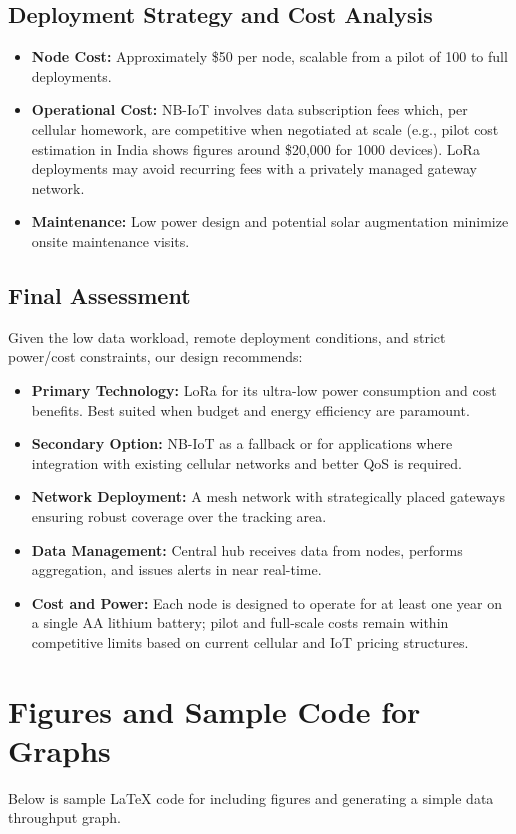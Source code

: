 \subsection{Deployment Strategy and Cost Analysis}
\begin{itemize}
    \item \textbf{Node Cost:} Approximately \$50 per node, scalable from a pilot of 100 to full deployments.
    \item \textbf{Operational Cost:} NB-IoT involves data subscription fees which, per cellular homework, are competitive when negotiated at scale (e.g., pilot cost estimation in India shows figures around \$20,000 for 1000 devices). LoRa deployments may avoid recurring fees with a privately managed gateway network.
    \item \textbf{Maintenance:} Low power design and potential solar augmentation minimize onsite maintenance visits.
\end{itemize}

\subsection{Final Assessment}
Given the low data workload, remote deployment conditions, and strict power/cost constraints, our design recommends:
\begin{itemize}
    \item \textbf{Primary Technology:} LoRa for its ultra-low power consumption and cost benefits. Best suited when budget and energy efficiency are paramount.
    \item \textbf{Secondary Option:} NB-IoT as a fallback or for applications where integration with existing cellular networks and better QoS is required.
    \item \textbf{Network Deployment:} A mesh network with strategically placed gateways ensuring robust coverage over the tracking area.
    \item \textbf{Data Management:} Central hub receives data from nodes, performs aggregation, and issues alerts in near real-time.
    \item \textbf{Cost and Power:} Each node is designed to operate for at least one year on a single AA lithium battery; pilot and full-scale costs remain within competitive limits based on current cellular and IoT pricing structures.
\end{itemize}

\section{Figures and Sample Code for Graphs}
Below is sample LaTeX code for including figures and generating a simple data throughput graph.
